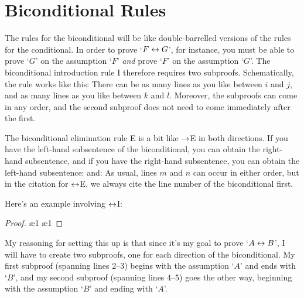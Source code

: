 \section{Biconditional Rules}
The rules for the biconditional will be like double-barrelled versions of the rules for the conditional.  In order to prove `$F \leftrightarrow G$', for instance, you must be able to prove `$G$' on the assumption `$F$' \emph{and} prove `$F$' on the assumption `$G$'. The biconditional introduction rule {\eiff}I therefore requires two subproofs. Schematically, the rule works like this:
There can be as many lines as you like between $i$ and $j$, and as many lines as you like between $k$ and $l$. Moreover, the subproofs can come in any order, and the second subproof does not need to come immediately after the first.

The biconditional elimination rule {\eiff}E is a bit like $\rightarrow$E in both directions. If you have the left-hand subsentence of the biconditional, you can obtain the right-hand subsentence, and if you have the right-hand subsentence, you can obtain the left-hand subsentence:
and:
As usual, lines $m$ and $n$ can occur in either order, but in the citation for $\leftrightarrow$E, we always cite the line number of the biconditional first.

Here's an example involving $\leftrightarrow$I:


\begin{proof}
 
\open
{}  
 \ae{1}
\close
\open
{} 
 \ae{1}
\close
{} 
\end{proof}

My reasoning for setting this up is that since it's my goal to prove `$A \leftrightarrow B$', I will have to create two subproofs, one for each direction of the biconditional. My first subproof (spanning lines 2--3) begins with the assumption `$A$' and ends with `$B$', and my second subproof (spanning lines 4--5) goes the other way, beginning with the assumption `$B$' and ending with `$A$'.


